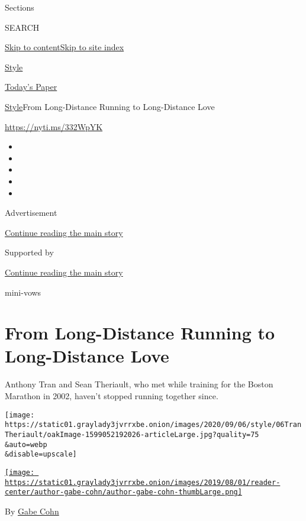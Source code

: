 Sections

SEARCH

\protect\hyperlink{site-content}{Skip to
content}\protect\hyperlink{site-index}{Skip to site index}

\href{https://www.nytimes3xbfgragh.onion/section/style}{Style}

\href{https://myaccount.nytimes3xbfgragh.onion/auth/login?response_type=cookie\&client_id=vi}{}

\href{https://www.nytimes3xbfgragh.onion/section/todayspaper}{Today's
Paper}

\href{/section/style}{Style}\textbar{}From Long-Distance Running to
Long-Distance Love

\url{https://nyti.ms/332WpYK}

\begin{itemize}
\item
\item
\item
\item
\item
\end{itemize}

Advertisement

\protect\hyperlink{after-top}{Continue reading the main story}

Supported by

\protect\hyperlink{after-sponsor}{Continue reading the main story}

mini-vows

\hypertarget{from-long-distance-running-to-long-distance-love}{%
\section{From Long-Distance Running to Long-Distance
Love}\label{from-long-distance-running-to-long-distance-love}}

Anthony Tran and Sean Theriault, who met while training for the Boston
Marathon in 2002, haven't stopped running together since.

\texttt{[image: https://static01.graylady3jvrrxbe.onion/images/2020/09/06/style/06TranTheriault/oakImage-1599052192026-articleLarge.jpg?quality=75\\\&auto=webp\\\&disable=upscale]}

\href{https://www.nytimes3xbfgragh.onion/by/gabe-cohn}{\texttt{[image: https://static01.graylady3jvrrxbe.onion/images/2019/08/01/reader-center/author-gabe-cohn/author-gabe-cohn-thumbLarge.png]}}

By \href{https://www.nytimes3xbfgragh.onion/by/gabe-cohn}{Gabe Cohn}

